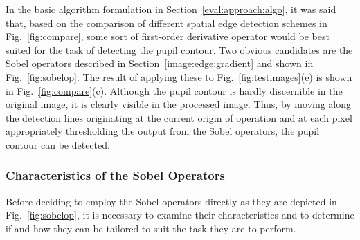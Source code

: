 
In the basic algorithm formulation in
Section~\ref{eval:approach:algo}, it was said that, based on the
comparison of different spatial edge detection schemes in
Fig.~\ref{fig:compare}, some sort of first-order derivative operator
would be best suited for the task of detecting the pupil contour.  Two
obvious candidates are the Sobel operators described in
Section~\ref{image:edge:gradient} and shown in Fig.~\ref{fig:sobelop}.
The result of applying these to Fig.~\ref{fig:testimages}(e) is shown
in Fig.~\ref{fig:compare}(c).  Although the pupil contour is hardly
discernible in the original image, it is clearly visible in the
processed image.  Thus, by moving along the detection lines
originating at the current origin of operation and at each pixel
appropriately thresholding the output from the Sobel operators, the
pupil contour can be detected.

\subsubsection{Characteristics of the Sobel Operators}

Before deciding to employ the Sobel operators directly as they are
depicted in Fig.~\ref{fig:sobelop}, it is necessary to examine their
characteristics and to determine if and how they can be tailored to
suit the task they are to perform.

